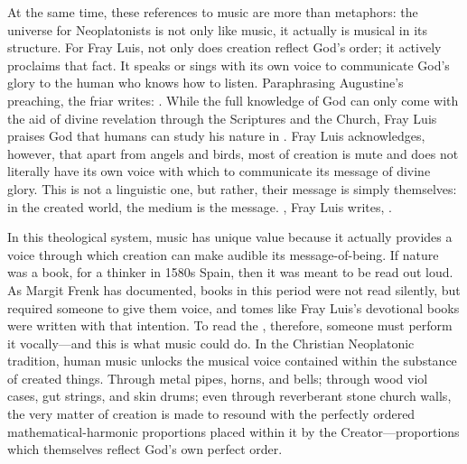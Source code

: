 At the same time, these references to music are more than metaphors: the
universe for Neoplatonists is not only like music, it actually is musical in
its structure.
For Fray Luis, not only does creation reflect God's order; it actively
proclaims that fact.
It speaks or sings with its own voice to communicate God's glory to the human
who knows how to listen.
Paraphrasing Augustine's preaching, the friar writes: .%
    \Autocite[185, glossing Augustine's commentary on ]
    {LuisdeGranada:Simbolo} 
While the full knowledge of God can only come with the aid of divine revelation
through the Scriptures and the Church, Fray Luis praises God that humans can
study his nature in .%
    \Autocite[186]{LuisdeGranada:Simbolo}
Fray Luis acknowledges, however, that apart from angels and birds, most of
creation is mute and does not literally have its own voice with which to
communicate its message of divine glory.
This  is not a linguistic one, but rather, their message is
simply themselves: in the created world, the medium is the message.
, Fray Luis writes, .%
    \Autocite[192]{LuisdeGranada:Simbolo}

In this theological system, music has unique value because it actually provides
a voice through which creation can make audible its message-of-being.
If nature was a book, for a thinker in 1580s Spain, then it was meant to be
read out loud.
As Margit Frenk has documented, books in this period were not read silently,
but required someone to give them voice, and tomes like Fray Luis's devotional
books were written with that intention.%
    \Autocite{Frenk:Voz}
To read the , therefore, someone must perform it
vocally---and this is what music could do.
In the Christian Neoplatonic tradition, human music unlocks the musical voice
contained within the substance of created things.
Through metal pipes, horns, and bells; through wood viol cases, gut strings,
and skin drums; even through reverberant stone church walls, the very matter of
creation is made to resound with the perfectly ordered mathematical-harmonic
proportions placed within it by the Creator---proportions which themselves
reflect God's own perfect order.

